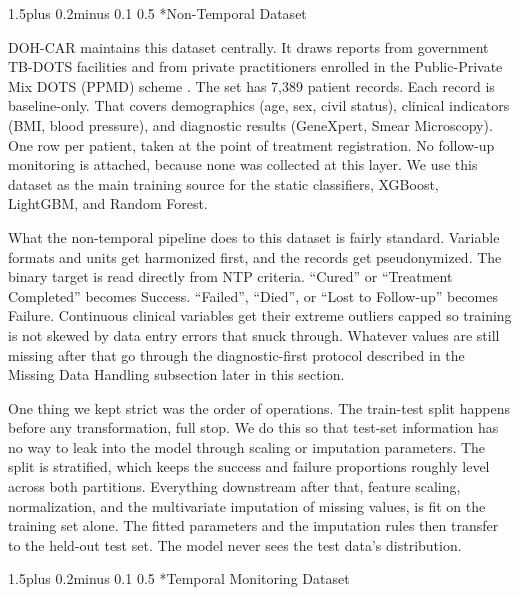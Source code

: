 \documentclass[12pt]{article}
\makeatletter
\renewcommand{\_}{\textunderscore\allowbreak}
\renewcommand{\subsubsection}{\@startsection{subsubsection}{3}{0pt}%
  {1.5\baselineskip plus 0.2\baselineskip minus 0.1\baselineskip}%
  {0.5\baselineskip}%
  {\bfseries\itshape\normalsize}}
\makeatother
\begin{document}


\subsubsection*{Non-Temporal Dataset}

DOH-CAR maintains this dataset centrally. It draws reports from government TB-DOTS facilities and from private practitioners enrolled in the Public-Private Mix DOTS (PPMD) scheme \citep{ref6}. The set has 7,389 patient records. Each record is baseline-only. That covers demographics (age, sex, civil status), clinical indicators (BMI, blood pressure), and diagnostic results (GeneXpert, Smear Microscopy). One row per patient, taken at the point of treatment registration. No follow-up monitoring is attached, because none was collected at this layer. We use this dataset as the main training source for the static classifiers, XGBoost, LightGBM, and Random Forest.

What the non-temporal pipeline does to this dataset is fairly standard. Variable formats and units get harmonized first, and the records get pseudonymized. The binary target is read directly from NTP criteria. ``Cured'' or ``Treatment Completed'' becomes Success. ``Failed'', ``Died'', or ``Lost to Follow-up'' becomes Failure. Continuous clinical variables get their extreme outliers capped so training is not skewed by data entry errors that snuck through. Whatever values are still missing after that go through the diagnostic-first protocol described in the Missing Data Handling subsection later in this section.

One thing we kept strict was the order of operations. The train-test split happens before any transformation, full stop. We do this so that test-set information has no way to leak into the model through scaling or imputation parameters. The split is stratified, which keeps the success and failure proportions roughly level across both partitions. Everything downstream after that, feature scaling, normalization, and the multivariate imputation of missing values, is fit on the training set alone. The fitted parameters and the imputation rules then transfer to the held-out test set. The model never sees the test data's distribution.

\subsubsection*{Temporal Monitoring Dataset}
\end{document}
